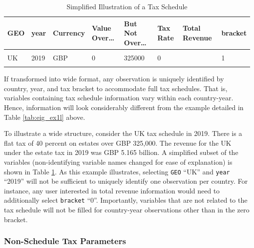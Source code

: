 \documentclass[
]{article}
\begin{document}
\begin{table}
\centering
\caption{\label{tab:eig_ex1}Simplified Illustration of a Tax Schedule}
\centering
\begin{tabular}[t]{llllllll}
\toprule
GEO & year & Currency & Value Over… & But Not Over… & Tax Rate & Total Revenue & bracket\\
\midrule
\cellcolor{gray!10}{UK} & \cellcolor{gray!10}{2019} & \cellcolor{gray!10}{GBP} & \cellcolor{gray!10}{} & \cellcolor{gray!10}{} & \cellcolor{gray!10}{} & \cellcolor{gray!10}{5,165,000,000} & \cellcolor{gray!10}{0}\\
\addlinespace
UK & 2019 & GBP & 0 & 325000 & 0 &  & 1\\
\addlinespace
\cellcolor{gray!10}{UK} & \cellcolor{gray!10}{2019} & \cellcolor{gray!10}{GBP} & \cellcolor{gray!10}{325000} & \cellcolor{gray!10}{\_and\_over} & \cellcolor{gray!10}{40} & \cellcolor{gray!10}{} & \cellcolor{gray!10}{2}\\
\bottomrule
\end{tabular}
\end{table}

If transformed into wide format, any observation is uniquely identified
by country, year, and tax bracket to accommodate full tax schedules.
That is, variables containing tax schedule information vary within each
country-year. Hence, information will look considerably different from
the example detailed in Table \ref{tab:eig_ex1l} above.

To illustrate a wide structure, consider the UK tax schedule in 2019.
There is a flat tax of 40 percent on estates over GBP 325,000. The
revenue for the UK under the estate tax in 2019 was GBP 5.165 billion. A
simplified subset of the variables (non-identifying variable names
changed for ease of explanation) is shown in Table \ref{tab:eig_ex1}. As
this example illustrates, selecting \texttt{GEO} ``UK'' and
\texttt{year} ``2019'' will not be sufficient to uniquely identify one
observation per country. For instance, any user interested in total
revenue information would need to additionally select \texttt{bracket}
``0''. Importantly, variables that are not related to the tax schedule
will not be filled for country-year observations other than in the zero
bracket.

\subsubsection{Non-Schedule Tax
Parameters}\label{non-schedule-tax-parameters}
\end{document}
